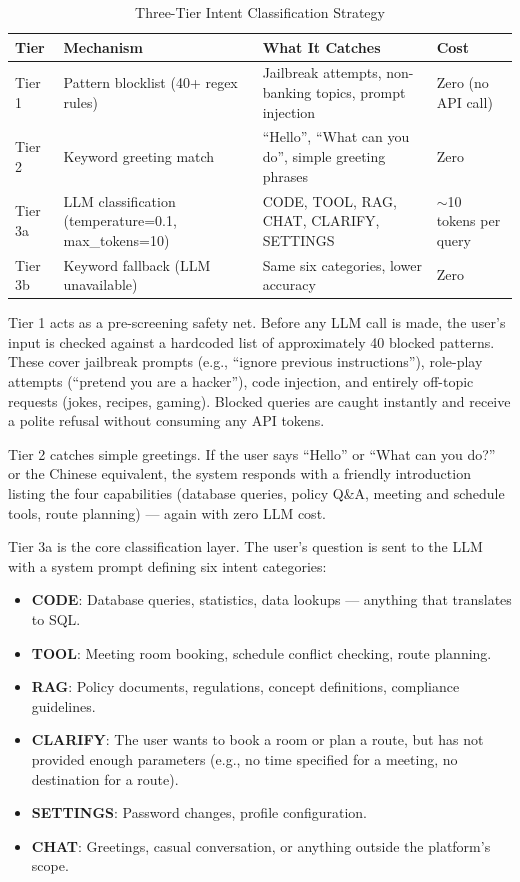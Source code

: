 \begin{table}[H]
\centering
\small\singlespacing
\caption{Three-Tier Intent Classification Strategy}
\label{tab:three-tier}
\begin{tabularx}{\textwidth}{>{\RaggedRight\arraybackslash}p{}>{\RaggedRight\arraybackslash}p{}>{\RaggedRight\arraybackslash}p{}>{\RaggedRight\arraybackslash}p{}}
\toprule
\textbf{Tier} & \textbf{Mechanism} & \textbf{What It Catches} & \textbf{Cost} \\
\midrule
Tier 1 & Pattern blocklist (40+ regex rules) & Jailbreak attempts, non-banking topics, prompt injection & Zero (no API call) \\
Tier 2 & Keyword greeting match & ``Hello'', ``What can you do'', simple greeting phrases & Zero \\
Tier 3a & LLM classification (temperature=0.1, max\_tokens=10) & CODE, TOOL, RAG, CHAT, CLARIFY, SETTINGS & $\sim$10 tokens per query \\
Tier 3b & Keyword fallback (LLM unavailable) & Same six categories, lower accuracy & Zero \\
\bottomrule
\end{tabularx}
\end{table}

Tier 1 acts as a pre-screening safety net. Before any LLM call is made, the user's input is checked against a hardcoded list of approximately 40 blocked patterns. These cover jailbreak prompts (e.g., ``ignore previous instructions''), role-play attempts (``pretend you are a hacker''), code injection, and entirely off-topic requests (jokes, recipes, gaming). Blocked queries are caught instantly and receive a polite refusal without consuming any API tokens.

Tier 2 catches simple greetings. If the user says ``Hello'' or ``What can you do?'' or the Chinese equivalent, the system responds with a friendly introduction listing the four capabilities (database queries, policy Q\&A, meeting and schedule tools, route planning) --- again with zero LLM cost.

Tier 3a is the core classification layer. The user's question is sent to the LLM with a system prompt defining six intent categories:

\begin{itemize}
  \item \textbf{CODE}: Database queries, statistics, data lookups --- anything that translates to SQL.
  \item \textbf{TOOL}: Meeting room booking, schedule conflict checking, route planning.
  \item \textbf{RAG}: Policy documents, regulations, concept definitions, compliance guidelines.
  \item \textbf{CLARIFY}: The user wants to book a room or plan a route, but has not provided enough parameters (e.g., no time specified for a meeting, no destination for a route).
  \item \textbf{SETTINGS}: Password changes, profile configuration.
  \item \textbf{CHAT}: Greetings, casual conversation, or anything outside the platform's scope.
\end{itemize}

